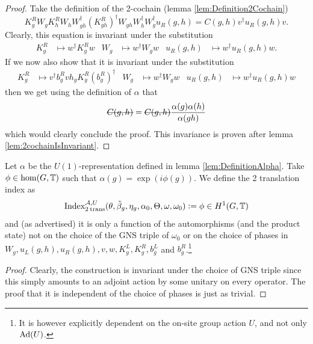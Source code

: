 \documentclass[11pt,a4paper,twoside]{article}
\numberwithin{equation}{section}
\begin{document}
	\begin{proof}
		Take the definition of the 2-cochain (lemma \ref{lem:Definition2Cochain})
		\begin{equation}\label{eq:Definition2Cochain2TranslationSection}
			K_g^RW_gK_h^RW_hW_{gh}^\dagger(K_{gh}^R)^\dagger W_{gh}W_{h}^\dagger W_g^\dagger u_R(g,h)=C(g,h)v^\dagger u_R(g,h)v.
		\end{equation}
		Clearly, this equation is invariant under the substitution
		\begin{align}
			K_g^R&\mapsto w^\dagger K_g^R w&W_g&\mapsto w^\dagger W_g w&u_R(g,h)&\mapsto w^\dagger u_R(g,h)w.
		\end{align}
		If we now also show that it is invariant under the substitution
		\begin{align}
			K_g^R&\mapsto v^\dagger b_g^R v h_g K_g^R (b_g^R)^\dagger&W_g&\mapsto w^\dagger W_g w&u_R(g,h)&\mapsto w^\dagger u_R(g,h)w
		\end{align}
		then we get using the definition of $\alpha$ that
		\begin{equation}
			\stkout{C(g,h)}=\stkout{C(g,h)}\frac{\alpha(g)\alpha(h)}{\alpha(gh)}
		\end{equation}
		which would clearly conclude the proof. This invariance is proven after lemma \ref{lem:2cochainIsInvariant}.
	\end{proof}
	\begin{definition}\label{def:DefinitionOfTheH1ValuedIndex}
		Let $\alpha$ be the $U(1)$-representation defined in lemma \ref{lem:DefinitionAlpha}. Take $\phi\in\hom(G,\mathbb T)$ such that $\alpha(g)=\exp(i\phi(g))$. We define the 2 translation index as
		\begin{equation}
			\textrm{Index}_{2\:\text{trans}}^{\mathcal A,U}(\theta,\tilde{\beta}_g,\eta_g,\alpha_0,\Theta,\omega,\omega_0)\vcentcolon= \phi\in H^1(G,\mathbb T)
		\end{equation}
		and (as advertised) it is only a function of the automorphisms (and the product state) not on the choice of the GNS triple of $\omega_0$ or on the choice of phases in $W_g,u_L(g,h),u_R(g,h),v,w,K^L_g,K^R_g,b^L_g$ and $b^R_g$.\footnote{It is however explicitly dependent on the on-site group action $U$, and not only $\Ad{U}$.}
	\end{definition}
	\begin{proof}
		Clearly, the construction is invariant under the choice of GNS triple since this simply amounts to an adjoint action by some unitary on every operator. The proof that it is independent of the choice of phases is just as trivial.
	\end{proof}
\end{document}

